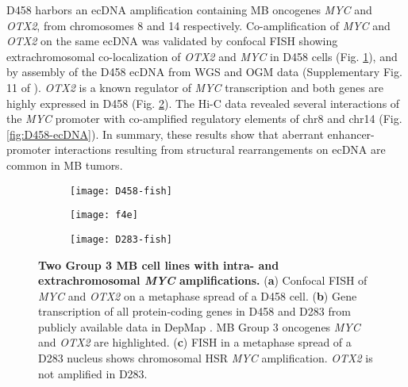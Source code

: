 \par D458 harbors an ecDNA amplification containing MB oncogenes \textit{MYC} and \textit{OTX2}, from chromosomes 8 and 14 respectively. Co-amplification of \textit{MYC} and \textit{OTX2} on the same ecDNA was validated by confocal FISH showing extrachromosomal co-localization of \textit{OTX2} and \textit{MYC} in D458 cells (Fig. \ref{D458-fish}), and by assembly of the D458 ecDNA from WGS and OGM data (Supplementary Fig. 11 of \cite{Chapman}). \textit{OTX2} is a known regulator of \textit{MYC} transcription and both genes are highly expressed in D458 (Fig. \ref{subfig:f4e}). The Hi-C data revealed several interactions of the \textit{MYC} promoter with co-amplified regulatory elements of chr8 and chr14 (Fig. \ref{fig:D458-ecDNA}). In summary, these results show that aberrant enhancer-promoter interactions resulting from structural rearrangements on ecDNA are common in MB tumors. 

\begin{figure}[!h]
    \centering
    \begin{subfigure}{\textwidth}
        \centering
        \texttt{[image: D458-fish]}
        \caption{}
        \label{D458-fish}
    \end{subfigure}
    \begin{subfigure}{.54\textwidth}
        \centering
        \texttt{[image: f4e]}
        \caption{}
        \label{subfig:f4e}
    \end{subfigure}
    \begin{subfigure}{.44\textwidth}
        \centering
        \texttt{[image: D283-fish]}
        \caption{}
        \label{subfig:D283-fish}
    \end{subfigure}
    \caption[Two Group 3 MB cell lines with intra- and extrachromosomal \textit{MYC} amplifications.]{\textbf{Two Group 3 MB cell lines with intra- and extrachromosomal \textit{MYC} amplifications.} (\textbf{a}) Confocal FISH of \textit{MYC} and \textit{OTX2} on a metaphase spread of a D458 cell. (\textbf{b}) Gene transcription of all protein-coding genes in D458 and D283 from publicly available data in DepMap \cite{depmap}.  MB Group 3 oncogenes \textit{MYC} and \textit{OTX2} are highlighted. (\textbf{c}) FISH in a metaphase spread of a D283 nucleus shows chromosomal \gls{HSR} \textit{MYC} amplification. \textit{OTX2} is not amplified in D283.}
    \label{fig:D458-fish}
\end{figure}


